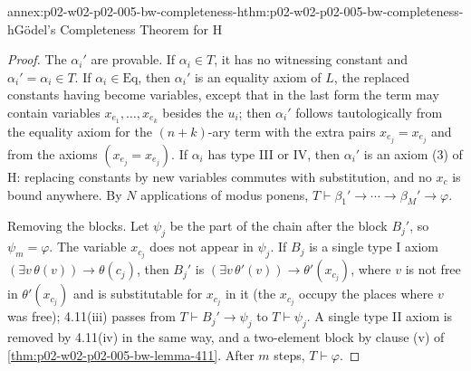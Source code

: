 \begin{annexitem}{annex:p02-w02-p02-005-bw-completeness-h}{thm:p02-w02-p02-005-bw-completeness-h}{G\"odel's Completeness Theorem for H}
\begin{proof}
The \(\alpha_i'\) are provable.  If \(\alpha_i\in T\), it has no witnessing
constant and \(\alpha_i'=\alpha_i\in T\).  If \(\alpha_i\in\mathrm{Eq}\),
then \(\alpha_i'\) is an equality axiom of \(L\), the replaced constants
having become variables, except that in the last form the term may contain
variables \(x_{e_1},\ldots,x_{e_k}\) besides the \(u_i\); then
\(\alpha_i'\) follows tautologically from the equality axiom for the
\((n+k)\)-ary term with the extra pairs \(x_{e_j}=x_{e_j}\) and from the
axioms \((x_{e_j}=x_{e_j})\).  If \(\alpha_i\) has type III or IV, then
\(\alpha_i'\) is an axiom (3) of H: replacing constants by new variables
commutes with substitution, and no \(x_c\) is bound anywhere.  By \(N\)
applications of modus ponens, \(T\vdash\beta_1'\to\cdots\to\beta_M'\to\varphi\).

Removing the blocks.  Let \(\psi_j\) be the part of the chain after the
block \(B_j'\), so \(\psi_m=\varphi\).  The variable \(x_{c_j}\) does not
appear in \(\psi_j\).  If \(B_j\) is a single type I axiom
\((\exists v\,\theta(v))\to\theta(c_j)\), then \(B_j'\) is
\((\exists v\,\theta'(v))\to\theta'(x_{c_j})\), where \(v\) is not free in
\(\theta'(x_{c_j})\) and is substitutable for \(x_{c_j}\) in it (the
\(x_{c_j}\) occupy the places where \(v\) was free); 4.11(iii) passes from
\(T\vdash B_j'\to\psi_j\) to \(T\vdash\psi_j\).  A single type II axiom is
removed by 4.11(iv) in the same way, and a two-element block by clause (v)
of \cref{thm:p02-w02-p02-005-bw-lemma-411}.  After \(m\) steps,
\(T\vdash\varphi\).
\end{proof}
\end{annexitem}

